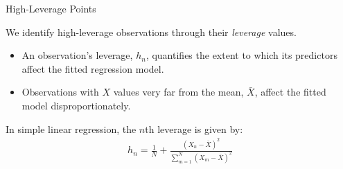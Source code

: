 \documentclass[10pt]{beamer}\usepackage[]{graphicx}\usepackage[]{color}
\begin{document}
\watermarkon %

\begin{frame}{High-Leverage Points}

  We identify high-leverage observations through their \emph{leverage} values.
  \vb
  \begin{itemize}
  \item An observation's leverage, $h_n$, quantifies the extent to which its
    predictors affect the fitted regression model.
    \vb
  \item Observations with $X$ values very far from the mean, $\bar{X}$, affect
    the fitted model disproportionately.
  \end{itemize}
  \vb
  \pause
  In simple linear regression, the $n$th leverage is given by:
  \begin{align*}
    h_n = \frac{1}{N} + \frac{\left(X_n - \bar{X}\right)^2}
    {\sum_{m = 1}^N \left(X_{m} - \bar{X}\right)^2}
  \end{align*}

\end{frame}

\watermarkoff %
\end{document}
